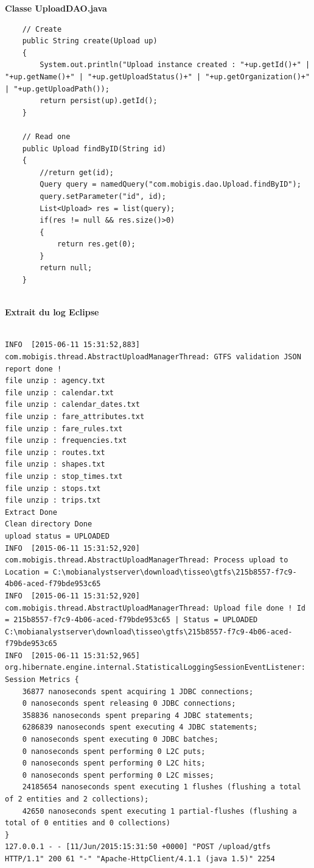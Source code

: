\textbf{Classe UploadDAO.java}\\

\begin{lstlisting}
	// Create 
    public String create(Upload up)
    {
        System.out.println("Upload instance created : "+up.getId()+" | "+up.getName()+" | "+up.getUploadStatus()+" | "+up.getOrganization()+" | "+up.getUploadPath());
        return persist(up).getId();
    }

    // Read one
    public Upload findByID(String id)
    {
        //return get(id);
        Query query = namedQuery("com.mobigis.dao.Upload.findByID");
        query.setParameter("id", id);
        List<Upload> res = list(query);
        if(res != null && res.size()>0)
        {
            return res.get(0);
        }
        return null;
    }
\end{lstlisting} \\


\textbf{Extrait du log Eclipse}\\

\begin{lstlisting}

INFO  [2015-06-11 15:31:52,883] com.mobigis.thread.AbstractUploadManagerThread: GTFS validation JSON report done !
file unzip : agency.txt
file unzip : calendar.txt
file unzip : calendar_dates.txt
file unzip : fare_attributes.txt
file unzip : fare_rules.txt
file unzip : frequencies.txt
file unzip : routes.txt
file unzip : shapes.txt
file unzip : stop_times.txt
file unzip : stops.txt
file unzip : trips.txt
Extract Done
Clean directory Done
upload status = UPLOADED
INFO  [2015-06-11 15:31:52,920] com.mobigis.thread.AbstractUploadManagerThread: Process upload to Location = C:\mobianalystserver\download\tisseo\gtfs\215b8557-f7c9-4b06-aced-f79bde953c65
INFO  [2015-06-11 15:31:52,920] com.mobigis.thread.AbstractUploadManagerThread: Upload file done ! Id = 215b8557-f7c9-4b06-aced-f79bde953c65 | Status = UPLOADED
C:\mobianalystserver\download\tisseo\gtfs\215b8557-f7c9-4b06-aced-f79bde953c65
INFO  [2015-06-11 15:31:52,965] org.hibernate.engine.internal.StatisticalLoggingSessionEventListener: Session Metrics {
    36877 nanoseconds spent acquiring 1 JDBC connections;
    0 nanoseconds spent releasing 0 JDBC connections;
    358836 nanoseconds spent preparing 4 JDBC statements;
    6286839 nanoseconds spent executing 4 JDBC statements;
    0 nanoseconds spent executing 0 JDBC batches;
    0 nanoseconds spent performing 0 L2C puts;
    0 nanoseconds spent performing 0 L2C hits;
    0 nanoseconds spent performing 0 L2C misses;
    24185654 nanoseconds spent executing 1 flushes (flushing a total of 2 entities and 2 collections);
    42650 nanoseconds spent executing 1 partial-flushes (flushing a total of 0 entities and 0 collections)
}
127.0.0.1 - - [11/Jun/2015:15:31:50 +0000] "POST /upload/gtfs HTTP/1.1" 200 61 "-" "Apache-HttpClient/4.1.1 (java 1.5)" 2254
\end{lstlisting} 

